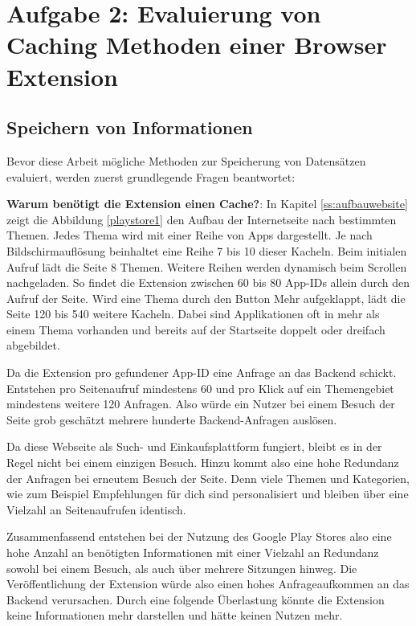 \section{Aufgabe 2: Evaluierung von Caching Methoden einer Browser Extension}
\label{s:evaluierungcaching}


\subsection{Speichern von Informationen}
\label{ss:speichern}

Bevor diese Arbeit mögliche Methoden zur Speicherung von Datensätzen evaluiert, werden zuerst grundlegende Fragen beantwortet:

\textbf{Warum benötigt die Extension einen Cache?}:
In Kapitel \ref{ss:aufbauwebsite} zeigt die Abbildung \ref{playstore1} den Aufbau der Internetseite nach bestimmten Themen. Jedes Thema wird mit einer Reihe von Apps dargestellt. Je nach Bildschirmauflösung beinhaltet eine Reihe 7 bis 10 dieser Kacheln.
Beim initialen Aufruf lädt die Seite 8 Themen. Weitere Reihen werden dynamisch beim Scrollen nachgeladen. So findet die Extension zwischen 60 bis 80 App-IDs allein durch den Aufruf der Seite. Wird eine Thema durch den Button \glqq Mehr\grqq{} aufgeklappt, lädt die Seite 120 bis 540 weitere Kacheln. Dabei sind Applikationen oft in mehr als einem Thema vorhanden und bereits auf der Startseite doppelt oder dreifach abgebildet.

Da die Extension pro gefundener App-ID eine Anfrage an das Backend schickt. Entstehen pro Seitenaufruf mindestens 60 und pro Klick auf ein Themengebiet mindestens weitere 120 Anfragen. Also würde ein Nutzer bei einem Besuch der Seite grob geschätzt mehrere hunderte Backend-Anfragen auslösen.

Da diese Webseite als Such- und Einkaufsplattform fungiert, bleibt es in der Regel nicht bei einem einzigen Besuch. Hinzu kommt also eine hohe Redundanz der Anfragen bei erneutem Besuch der Seite. Denn viele Themen und Kategorien, wie zum Beispiel \glqq Empfehlungen für dich \grqq{} sind personalisiert und bleiben über eine Vielzahl an Seitenaufrufen identisch.

Zusammenfassend entstehen bei der Nutzung des Google Play Stores also eine hohe Anzahl an benötigten Informationen mit einer Vielzahl an Redundanz sowohl bei einem Besuch, als auch über mehrere Sitzungen hinweg. Die Veröffentlichung der Extension würde also einen hohes Anfrageaufkommen an das Backend verursachen. Durch eine folgende Überlastung könnte die Extension keine Informationen mehr darstellen und hätte keinen Nutzen mehr.

